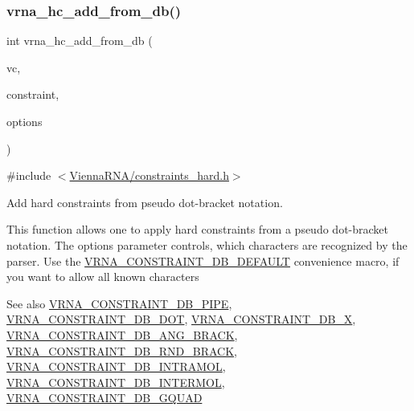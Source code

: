 \subsubsection{\texorpdfstring{vrna\+\_\+hc\+\_\+add\+\_\+from\+\_\+db()}{vrna\_hc\_add\_from\_db()}}
{\footnotesize\ttfamily int vrna\+\_\+hc\+\_\+add\+\_\+from\+\_\+db (\begin{DoxyParamCaption}\item[{\hyperlink{group__fold__compound_ga1b0cef17fd40466cef5968eaeeff6166}{vrna\+\_\+fold\+\_\+compound\+\_\+t} $\ast$}]{vc,  }\item[{const char $\ast$}]{constraint,  }\item[{unsigned int}]{options }\end{DoxyParamCaption})}



{\ttfamily \#include $<$\hyperlink{constraints__hard_8h}{Vienna\+R\+N\+A/constraints\+\_\+hard.\+h}$>$}



Add hard constraints from pseudo dot-\/bracket notation. 

This function allows one to apply hard constraints from a pseudo dot-\/bracket notation. The {\ttfamily options} parameter controls, which characters are recognized by the parser. Use the \hyperlink{group__hard__constraints_ga1c3864bdc92147a4d93de2b1b4356177}{V\+R\+N\+A\+\_\+\+C\+O\+N\+S\+T\+R\+A\+I\+N\+T\+\_\+\+D\+B\+\_\+\+D\+E\+F\+A\+U\+LT} convenience macro, if you want to allow all known characters

\begin{DoxySeeAlso}{See also}
\hyperlink{group__hard__constraints_ga13053547a2de5532b64b64d35e097ae1}{V\+R\+N\+A\+\_\+\+C\+O\+N\+S\+T\+R\+A\+I\+N\+T\+\_\+\+D\+B\+\_\+\+P\+I\+PE}, \hyperlink{group__hard__constraints_ga369bea82eae75fbe626f409fa425747e}{V\+R\+N\+A\+\_\+\+C\+O\+N\+S\+T\+R\+A\+I\+N\+T\+\_\+\+D\+B\+\_\+\+D\+OT}, \hyperlink{group__hard__constraints_ga7283bbe0f8954f7b030ecc3f2d1932b2}{V\+R\+N\+A\+\_\+\+C\+O\+N\+S\+T\+R\+A\+I\+N\+T\+\_\+\+D\+B\+\_\+X}, \hyperlink{constraints__hard_8h_ad54c1315a47d55653dcaa5de6e544b77}{V\+R\+N\+A\+\_\+\+C\+O\+N\+S\+T\+R\+A\+I\+N\+T\+\_\+\+D\+B\+\_\+\+A\+N\+G\+\_\+\+B\+R\+A\+CK}, \hyperlink{group__hard__constraints_gac17b034852c914bc5879954c65d7e74b}{V\+R\+N\+A\+\_\+\+C\+O\+N\+S\+T\+R\+A\+I\+N\+T\+\_\+\+D\+B\+\_\+\+R\+N\+D\+\_\+\+B\+R\+A\+CK}, \hyperlink{group__hard__constraints_ga5c17253f5a39d1d49b0fb11f5196982a}{V\+R\+N\+A\+\_\+\+C\+O\+N\+S\+T\+R\+A\+I\+N\+T\+\_\+\+D\+B\+\_\+\+I\+N\+T\+R\+A\+M\+OL}, \hyperlink{group__hard__constraints_ga31d0ebb9755ca8a4acafc14f00ca755d}{V\+R\+N\+A\+\_\+\+C\+O\+N\+S\+T\+R\+A\+I\+N\+T\+\_\+\+D\+B\+\_\+\+I\+N\+T\+E\+R\+M\+OL}, \hyperlink{group__hard__constraints_ga75cfab03cdc97c95b3ce8bb29f52b08e}{V\+R\+N\+A\+\_\+\+C\+O\+N\+S\+T\+R\+A\+I\+N\+T\+\_\+\+D\+B\+\_\+\+G\+Q\+U\+AD}
\end{DoxySeeAlso}

